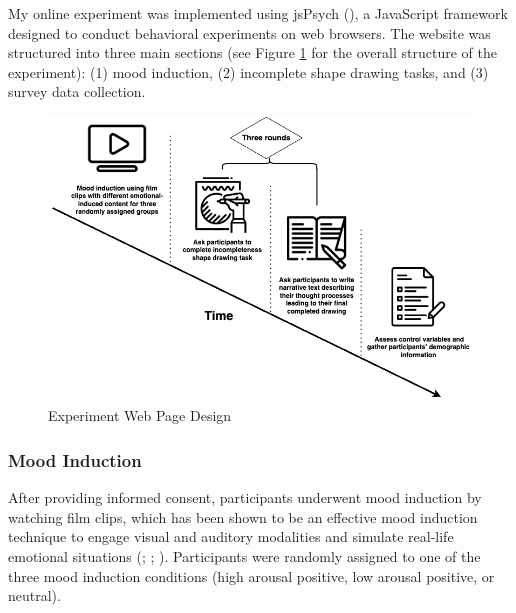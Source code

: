 \documentclass[../MA_Thesis.tex]{subfiles}
\begin{document}
My online experiment was implemented using jsPsych (\cite{leeuw_jspsych_2023}), a JavaScript framework designed to conduct behavioral experiments on web browsers. The website was structured into three main sections (see Figure \ref{fig: Experiment Web Page Design} for the overall structure of the experiment): (1) mood induction, (2) incomplete shape drawing tasks, and (3) survey data collection.

\begin{figure}
    \centering
    \includegraphics[width=0.7\linewidth, keepaspectratio]{drawio/Experiment Timeline.png}
    \caption{Experiment Web Page Design}
    \label{fig: Experiment Web Page Design}
\end{figure}

\subsubsection*{Mood Induction}
After providing informed consent, participants underwent mood induction by watching film clips, which has been shown to be an effective mood induction technique to engage visual and auditory modalities and simulate real-life emotional situations (\cite{coan_handbook_2007}; \cite{fernandez-aguilar_how_2019}; \cite{siedlecka_experimental_2019}). Participants were randomly assigned to one of the three mood induction conditions (high arousal positive, low arousal positive, or neutral). 
\end{document}
